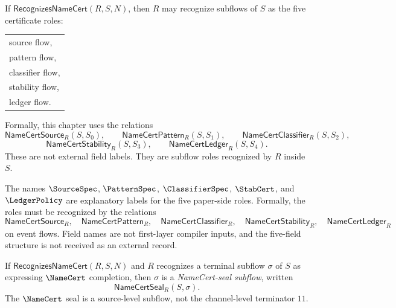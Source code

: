 \begin{definition}
\label{def:namecert-generated-field-subflows}
If $\mathsf{RecognizesNameCert}(R,S,N)$, then $R$ may recognize subflows of $S$ as the five certificate roles:
\begin{center}
\begin{tabular}{l}
  source flow, \\
  pattern flow, \\
  classifier flow, \\
  stability flow, \\
  ledger flow.
\end{tabular}
\end{center}
Formally, this chapter uses the relations
$$
  \mathsf{NameCertSource}_{R}(S,S_{0}), \qquad
  \mathsf{NameCertPattern}_{R}(S,S_{1}), \qquad
  \mathsf{NameCertClassifier}_{R}(S,S_{2}),
$$
$$
  \mathsf{NameCertStability}_{R}(S,S_{3}), \qquad
  \mathsf{NameCertLedger}_{R}(S,S_{4}).
$$
These are not external field labels. They are subflow roles recognized by $R$ inside $S$.
\end{definition}

\begin{remark}
\label{rem:namecert-generated-field-names-metalanguage}
The names $\SourceSpec$, $\PatternSpec$, $\ClassifierSpec$, $\StabCert$, and $\LedgerPolicy$ are explanatory labels for the five paper-side roles. Formally, the roles must be recognized by the relations
$$
  \mathsf{NameCertSource}_{R},\quad
  \mathsf{NameCertPattern}_{R},\quad
  \mathsf{NameCertClassifier}_{R},\quad
  \mathsf{NameCertStability}_{R},\quad
  \mathsf{NameCertLedger}_{R}
$$
on event flows. Field names are not first-layer compiler inputs, and the five-field structure is not received as an external record.
\end{remark}

\begin{definition}
\label{def:namecert-generated-seal-subflow}
If $\mathsf{RecognizesNameCert}(R,S,N)$ and $R$ recognizes a terminal subflow $\sigma$ of $S$ as expressing $\NameCert$ completion, then $\sigma$ is a \emph{NameCert-seal subflow}, written
$$
  \mathsf{NameCertSeal}_{R}(S,\sigma).
$$
The $\NameCert$ seal is a source-level subflow, not the channel-level terminator $11$.
\end{definition}

